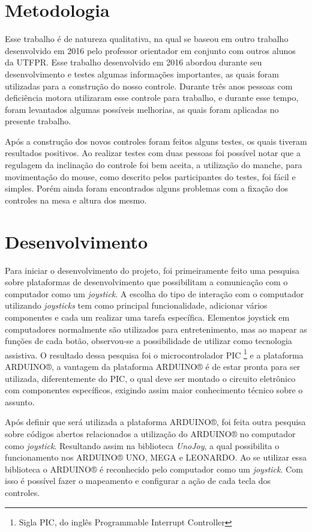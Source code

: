 \documentclass[
	12pt,			%
	openright,		%
	oneside,			%
	a4paper,			%
	chapter=TITLE,		%
	english,			%
	brazil,			%
	]{abntex2}
\begin{document}
\chapter{Metodologia}
\label{met}

Esse trabalho é de natureza qualitativa, na qual se baseou em outro trabalho desenvolvido em 2016 pelo professor orientador em conjunto com outros alunos da UTFPR. Esse trabalho desenvolvido em 2016 abordou durante seu desenvolvimento e testes algumas informações importantes, as quais foram utilizadas para a construção do nosso controle. Durante três anos pessoas com deficiência motora utilizaram esse controle para trabalho, e durante esse tempo, foram levantados algumas possíveis melhorias, as quais foram aplicadas no presente trabalho.

Após a construção dos novos controles foram feitos alguns testes, os quais tiveram resultados positivos. Ao realizar testes com duas pessoas foi possível notar que a regulagem da inclinação do controle foi bem aceita, a utilização do manche, para movimentação do mouse, como descrito pelos participantes do testes, foi fácil e simples. Porém ainda foram encontrados alguns problemas com a fixação dos controles na mesa e altura dos mesmo.

\chapter{Desenvolvimento}
\label{des}

Para iniciar o desenvolvimento do projeto, foi primeiramente feito uma pesquisa sobre plataformas de desenvolvimento que possibilitam a comunicação com o computador como um \emph{joystick}. A escolha do tipo de interação com o computador utilizando \emph{joysticks} tem como principal funcionalidade, adicionar vários componentes e cada um realizar uma tarefa específica. Elementos joystick em computadores normalmente são utilizados para entretenimento, mas ao mapear as funções de cada botão, observou-se a possibilidade de utilizar como tecnologia assistiva. O resultado dessa pesquisa foi o microcontrolador PIC \footnote{Sigla PIC, do inglês Programmable Interrupt Controller} e a plataforma ARDUINO®, a vantagem da plataforma ARDUINO® é de estar pronta para ser utilizada, diferentemente do PIC, o qual deve ser montado o circuito eletrônico com componentes específicos, exigindo assim maior conhecimento técnico sobre o assunto.

Após definir que será utilizada a plataforma ARDUINO®, foi feita outra pesquisa sobre códigos abertos relacionados a utilização do ARDUINO® no computador como \emph{joystick}. Resultando assim na biblioteca \emph{UnoJoy}, a qual possibilita o funcionamento nos ARDUINO® UNO, MEGA e LEONARDO. Ao se utilizar essa biblioteca o ARDUINO® é reconhecido pelo computador como um \emph{joystick}. Com isso é possível fazer o mapeamento e configurar a ação de cada tecla dos controles.
\end{document}
